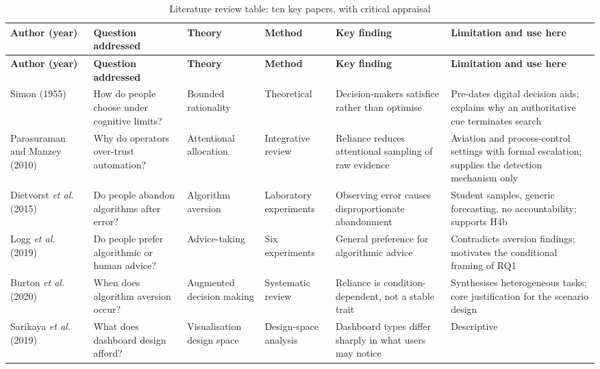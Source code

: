 \documentclass[11pt,a4paper]{article}
\numberwithin{figure}{section}
\numberwithin{table}{section}
\begin{document}
\begin{longtable}{@{}p{2.1cm} p{2.4cm} p{2.3cm} p{2.4cm} p{2.5cm} p{2.6cm}@{}}
\caption{Literature review table: ten key papers, with critical appraisal}\\
\toprule
\footnotesize\textbf{Author (year)} & \footnotesize\textbf{Question addressed} &
\footnotesize\textbf{Theory} & \footnotesize\textbf{Method} & \footnotesize\textbf{Key finding} &
\footnotesize\textbf{Limitation and use here} \\
\midrule
\endfirsthead
\toprule
\footnotesize\textbf{Author (year)} & \footnotesize\textbf{Question addressed} &
\footnotesize\textbf{Theory} & \footnotesize\textbf{Method} & \footnotesize\textbf{Key finding} &
\footnotesize\textbf{Limitation and use here} \\
\midrule
\endhead
\bottomrule
\endfoot
\footnotesize Simon (1955) & How do people choose under cognitive limits? & Bounded rationality &
Theoretical & Decision-makers satisfice rather than optimise & Pre-dates digital decision aids; explains
why an authoritative cue terminates search \\
\addlinespace
\footnotesize Parasuraman and Manzey (2010) & Why do operators over-trust automation? & Attentional
allocation & Integrative review & Reliance reduces attentional sampling of raw evidence & Aviation and
process-control settings with formal escalation; supplies the detection mechanism only \\
\addlinespace
\footnotesize Dietvorst \emph{et al.} (2015) & Do people abandon algorithms after error? & Algorithm
aversion & Laboratory experiments & Observing error causes disproportionate abandonment & Student samples,
generic forecasting, no accountability; supports H4b \\
\addlinespace
\footnotesize Logg \emph{et al.} (2019) & Do people prefer algorithmic or human advice? & Advice-taking &
Six experiments & General preference for algorithmic advice & Contradicts aversion findings; motivates the
conditional framing of RQ1 \\
\addlinespace
\footnotesize Burton \emph{et al.} (2020) & When does algorithm aversion occur? & Augmented decision making
& Systematic review & Reliance is condition-dependent, not a stable trait & Synthesises heterogeneous
tasks; core justification for the scenario design \\
\addlinespace
\footnotesize Sarikaya \emph{et al.} (2019) & What does dashboard design afford? & Visualisation design
space & Design-space analysis & Dashboard types differ sharply in what users may notice & Descriptive

\end{longtable}
\end{document}
